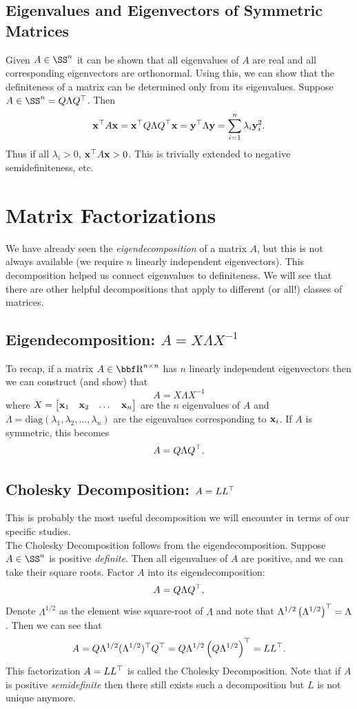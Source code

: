 \documentclass{article}
\begin{document}
\subsection{Eigenvalues and Eigenvectors of Symmetric Matrices}

Given $A\in\SS^n$ it can be shown that all eigenvalues of $A$ are
real and all corresponding eigenvectors are orthonormal. Using this,
we can show that the definiteness of a matrix can be determined only
from its eigenvalues. Suppose $A\in\SS^n = Q\Lambda Q^\T$. Then
\[
    {\bf x}^\top A{\bf x} = {\bf x}^\top Q\Lambda Q^\top{\bf x} = {\bf y}^\top\Lambda{\bf y} = \sum_{i=1}^n \lambda_i{\bf y}_i^2.
\]
Thus if all $\lambda_i > 0$, ${\bf x}^\top A{\bf x} > 0$. This is trivially extended
to negative semidefiniteness, etc.

\section{Matrix Factorizations}

We have already seen the \textit{eigendecomposition} of a matrix $A$,
but this is not always available (we require $n$ linearly independent
eigenvectors). This decomposition helped us connect eigenvalues to
definiteness. We will see that there are other helpful decompositions
that apply to different (or all!) classes of matrices.

\subsection{Eigendecomposition: $A = X\Lambda X^{-1}$}

To recap, if a matrix $A\in\RR^{n\times n}$ has $n$ linearly independent
eigenvectors then we can construct (and show) that
\[
    A = X \Lambda X^{-1}
\]
where $X = \begin{bmatrix} {\bf x}_1 & {\bf x}_2 & \dots & {\bf x}_n \end{bmatrix}$ are the $n$ eigenvalues of
$A$ and $\Lambda = \mathrm{diag}(\lambda_1, \lambda_2,\dots, \lambda_n)$
are the eigenvalues corresponding to ${\bf x}_i$. If $A$ is symmetric, this becomes
\[
    A = Q\Lambda Q^\top.
\]

\subsection{Cholesky Decomposition: $A = LL^\top$}

This is probably the most useful decomposition we will encounter
in terms of our specific studies.\\

The Cholesky Decomposition follows from the eigendecomposition.
Suppose $A\in\SS^n$ is positive \textit{definite}. Then all eigenvalues
of $A$ are positive, and we can take their square roots. Factor
$A$ into its eigendecomposition:
\[
    A = Q\Lambda Q^\top.
\]
Denote $\Lambda^{1/2}$ as the element wise square-root of $\Lambda$
and note that $\Lambda^{1/2}\left(\Lambda^{1/2}\right)^\top = \Lambda$.
Then we can see that
\[
    A = Q\Lambda^{1/2} (\Lambda^{1/2})^\top Q^\top = Q\Lambda^{1/2}\left(Q\Lambda^{1/2}\right)^\top = LL^\top.
\]
This factorization $A=LL^\top$ is called the Cholesky Decomposition. Note
that if $A$ is positive \textit{semidefinite} then there still exists such
a decomposition but $L$ is not unique anymore.\\
\end{document}
